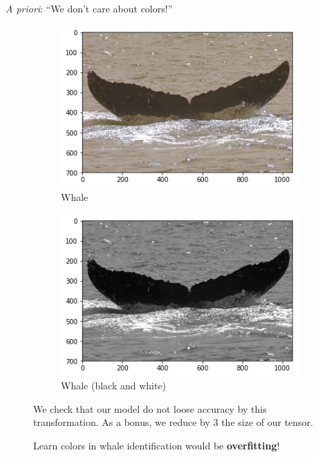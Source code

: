 \begin{frame}[c]{\emph{A priori}: ``We don't care about colors!''}
    \begin{figure}
        \centering
        \begin{subfigure}[b]{0.4\linewidth}
            \centering
            \includegraphics[width=\linewidth]{normal.png}
            \caption{Whale}
        \end{subfigure}
        \begin{subfigure}[b]{0.4\linewidth}
            \centering
            \includegraphics[width=\linewidth]{black_and_white.png}
            \caption{Whale (black and white)}
        \end{subfigure}
        \caption{Learn colors in whale identification would be \textbf{overfitting}!}
        We check that our model do not loose accuracy by this transformation. As a bonus, we reduce by 3 the size of our tensor.
    \end{figure}
\end{frame}

